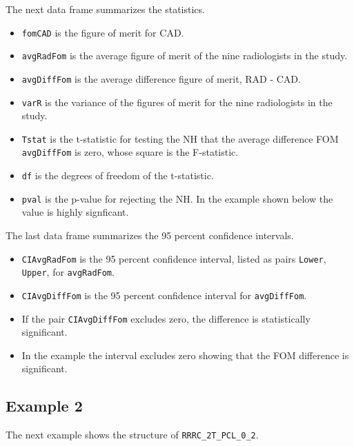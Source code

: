 \documentclass[
]{book}
\providecommand{\tightlist}{%
  \setlength{\itemsep}{0pt}\setlength{\parskip}{0pt}}
\begin{document}
The next data frame summarizes the statistics.

\begin{itemize}
\tightlist
\item
  \texttt{fomCAD} is the figure of merit for CAD.
\item
  \texttt{avgRadFom} is the average figure of merit of the nine radiologists in the study.
\item
  \texttt{avgDiffFom} is the average difference figure of merit, RAD - CAD.
\item
  \texttt{varR} is the variance of the figures of merit for the nine radiologists in the study.
\item
  \texttt{Tstat} is the t-statistic for testing the NH that the average difference FOM \texttt{avgDiffFom} is zero, whose square is the F-statistic.
\item
  \texttt{df} is the degrees of freedom of the t-statistic.
\item
  \texttt{pval} is the p-value for rejecting the NH. In the example shown below the value is highly signficant.
\end{itemize}

The last data frame summarizes the 95 percent confidence intervals.

\begin{itemize}
\tightlist
\item
  \texttt{CIAvgRadFom} is the 95 percent confidence interval, listed as pairs \texttt{Lower}, \texttt{Upper}, for \texttt{avgRadFom}.
\item
  \texttt{CIAvgDiffFom} is the 95 percent confidence interval for \texttt{avgDiffFom}.
\item
  If the pair \texttt{CIAvgDiffFom} excludes zero, the difference is statistically significant.
\item
  In the example the interval excludes zero showing that the FOM difference is significant.
\end{itemize}

\hypertarget{example-2-1}{%
\subsection{Example 2}\label{example-2-1}}

The next example shows the structure of \texttt{RRRC\_2T\_PCL\_0\_2}.
\end{document}
